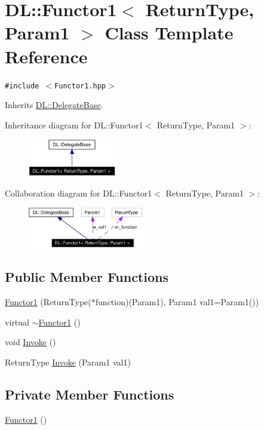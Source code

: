 \hypertarget{classDL_1_1Functor1}{
\section{DL::Functor1$<$ Return\-Type, Param1 $>$ Class Template Reference}
\label{classDL_1_1Functor1}
}
{\tt \#include $<$Functor1.hpp$>$}

Inherits \hyperlink{classDL_1_1DelegateBase}{DL::Delegate\-Base}.

Inheritance diagram for DL::Functor1$<$ Return\-Type, Param1 $>$:\begin{figure}[H]
\begin{center}
\leavevmode
\includegraphics[width=109pt]{classDL_1_1Functor1__inherit__graph}
\end{center}
\end{figure}
Collaboration diagram for DL::Functor1$<$ Return\-Type, Param1 $>$:\begin{figure}[H]
\begin{center}
\leavevmode
\includegraphics[width=152pt]{classDL_1_1Functor1__coll__graph}
\end{center}
\end{figure}
\subsection*{Public Member Functions}
\begin{CompactItemize}
\item 
\hyperlink{classDL_1_1Functor1_a0}{Functor1} (Return\-Type($\ast$function)(Param1), Param1 val1=Param1())
\item 
virtual \hyperlink{classDL_1_1Functor1_a1}{$\sim$Functor1} ()
\item 
void \hyperlink{classDL_1_1Functor1_a2}{Invoke} ()
\item 
Return\-Type \hyperlink{classDL_1_1Functor1_a3}{Invoke} (Param1 val1)
\end{CompactItemize}
\subsection*{Private Member Functions}
\begin{CompactItemize}
\item 
\hyperlink{classDL_1_1Functor1_d0}{Functor1} ()
\end{CompactItemize}
